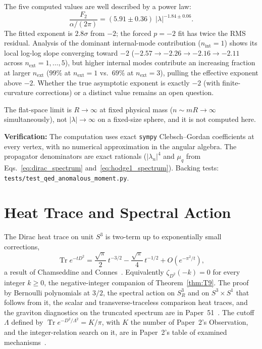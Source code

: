 \documentclass[11pt]{article}
\begin{document}
The five computed values are well described by a power law:
\begin{equation}
  \frac{F_2}{\alpha/(2\pi)} = (5.91 \pm 0.36)\;|\lambda|^{-1.84 \pm 0.06}.
  \label{eq:mode_power_law}
\end{equation}
The fitted exponent is $2.8\sigma$ from $-2$; the forced $p = -2$ fit
has twice the RMS residual.  Analysis of the dominant internal-mode
contribution ($n_{\mathrm{int}} = 1$) shows its local log-log slope
converging toward $-2$ ($-2.57 \to -2.26 \to -2.16 \to -2.11$ across
$n_{\mathrm{ext}} = 1, \ldots, 5$), but higher internal modes
contribute an increasing fraction at larger $n_{\mathrm{ext}}$
($99\%$ at $n_{\mathrm{ext}} = 1$ vs.\ $69\%$ at $n_{\mathrm{ext}} = 3$),
pulling the effective exponent above $-2$.  Whether the true asymptotic
exponent is exactly $-2$ (with finite-curvature corrections) or a
distinct value remains an open question.

The flat-space limit is $R \to \infty$ at fixed physical mass
($n \sim m R \to \infty$ simultaneously), not $|\lambda| \to \infty$ on
a fixed-size sphere, and it is not computed here.

\medskip
\noindent\textbf{Verification:} The computation uses exact
\texttt{sympy} Clebsch--Gordan coefficients at every vertex, with
no numerical approximation in the angular algebra.  The propagator
denominators are exact rationals ($|\lambda_n|^4$ and $\mu_q$ from
Eqs.~\eqref{eq:dirac_spectrum} and~\eqref{eq:hodge1_spectrum}).
Backing tests: \texttt{tests/test\_qed\_anomalous\_moment.py}.

\section{Heat Trace and Spectral Action}
\label{sec:one_loop}

The Dirac heat trace on unit $S^3$ is two-term up to exponentially
small corrections,
\begin{equation}
  \operatorname{Tr} e^{-tD^2}
  = \frac{\sqrt{\pi}}{2}\,t^{-3/2} - \frac{\sqrt{\pi}}{4}\,t^{-1/2}
  + O(e^{-\pi^2/t}),
  \label{eq:sd_two_term}
\end{equation}
a result of Chamseddine and Connes~\cite{chamseddine_connes_uncanny}.
Equivalently $\zeta_{D^2}(-k) = 0$ for every integer $k \ge 0$, the
negative-integer companion of Theorem~\ref{thm:T9}.  The proof by
Bernoulli polynomials at $3/2$, the spectral action on $S^3_R$ and on
$S^3 \times S^1$ that follows from it, the scalar and
transverse-traceless comparison heat traces, and the graviton
diagnostics on the truncated spectrum are in Paper~51~\cite{paper51}.
The cutoff $\Lambda$ defined by $\operatorname{Tr}
e^{-D^2/\Lambda^2} = K/\pi$, with $K$ the number of Paper~2's
Observation, and the integer-relation search on it, are in Paper~2's
table of examined mechanisms~\cite{paper2}.
\end{document}
